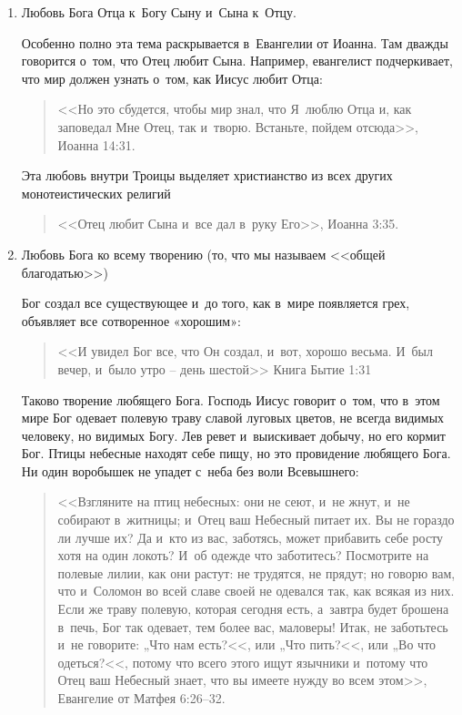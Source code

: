 \documentclass[a4paper,12pt]{article}
\begin{document}
\begin{enumerate}

    \item Любовь Бога Отца к~Богу Сыну и~Сына к~Отцу.
    
    Особенно полно эта тема раскрывается в~Евангелии от Иоанна. Там дважды говорится о~том, что Отец любит Сына. Например, евангелист подчеркивает, что мир должен узнать о~том, как Иисус любит Отца:
    \begin{quote}
        <<Но это сбудется, чтобы мир знал, что Я~люблю Отца и, как заповедал Мне Отец, так и~творю. Встаньте, пойдем отсюда>>, Иоанна 14:31.
    \end{quote}
        Эта любовь внутри Троицы выделяет христианство из всех других монотеистических религий
    \begin{quote}
        <<Отец любит Сына и~все дал в~руку Его>>, Иоанна 3:35.
    \end{quote}

    \item Любовь Бога ко всему творению (то, что мы называем <<общей благодатью>>)
    
    Бог создал все существующее и~до того, как в~мире появляется грех, объявляет все сотворенное «хорошим»:
    \begin{quote} 
         <<И увидел Бог все, что Он создал, и~вот, хорошо весьма. И~был вечер, и~было утро – день шестой>> Книга Бытие 1:31
    \end{quote}

    Таково творение любящего Бога. Господь Иисус говорит о~том, что в~этом мире Бог одевает полевую траву славой луговых цветов, не всегда видимых человеку, но видимых Богу. Лев ревет и~выискивает добычу, но его кормит Бог. Птицы небесные находят себе пищу, но это провидение любящего Бога. Ни один воробышек не упадет с~неба без воли Всевышнего: 

    \begin{quote} 
    <<Взгляните на птиц небесных: они не сеют, и~не жнут, и~не собирают в~житницы; и~Отец ваш Небесный питает их. Вы не гораздо ли лучше их? Да и~кто из вас, заботясь, может прибавить себе росту хотя на один локоть? И~об одежде что заботитесь? Посмотрите на полевые лилии, как они растут: не трудятся, не прядут; но говорю вам, что и~Соломон во всей славе своей не одевался так, как всякая из них. Если же траву полевую, которая сегодня есть, а~завтра будет брошена в~печь, Бог так одевает, тем более вас, маловеры! Итак, не заботьтесь и~не говорите: „Что нам есть?<<, или „Что пить?<<, или „Во что одеться?<<, потому что всего этого ищут язычники и~потому что Отец ваш Небесный знает, что вы имеете нужду во всем этом>>, Евангелие от Матфея 6:26--32.
    \end{quote}      
        

\end{enumerate}
\end{document}
